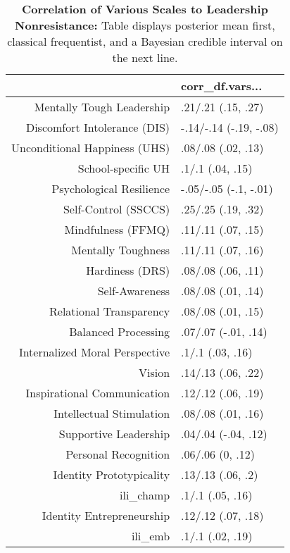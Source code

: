 \begin{table}[ht]
\centering
\begin{tabular}{rl}
  \hline
 & corr\_df.vars... \\ 
  \hline
Mentally Tough Leadership & .21/.21 (.15, .27) \\ 
  Discomfort Intolerance (DIS) & -.14/-.14 (-.19, -.08) \\ 
  Unconditional Happiness (UHS) & .08/.08 (.02, .13) \\ 
  School-specific UH & .1/.1 (.04, .15) \\ 
  Psychological Resilience & -.05/-.05 (-.1, -.01) \\ 
  Self-Control (SSCCS) & .25/.25 (.19, .32) \\ 
  Mindfulness (FFMQ) & .11/.11 (.07, .15) \\ 
  Mentally Toughness & .11/.11 (.07, .16) \\ 
  Hardiness (DRS) & .08/.08 (.06, .11) \\ 
  Self-Awareness & .08/.08 (.01, .14) \\ 
  Relational Transparency & .08/.08 (.01, .15) \\ 
  Balanced Processing & .07/.07 (-.01, .14) \\ 
  Internalized Moral Perspective & .1/.1 (.03, .16) \\ 
  Vision & .14/.13 (.06, .22) \\ 
  Inspirational Communication & .12/.12 (.06, .19) \\ 
  Intellectual Stimulation & .08/.08 (.01, .16) \\ 
  Supportive Leadership & .04/.04 (-.04, .12) \\ 
  Personal Recognition & .06/.06 (0, .12) \\ 
  Identity Prototypicality & .13/.13 (.06, .2) \\ 
  ili\_champ & .1/.1 (.05, .16) \\ 
  Identity Entrepreneurship & .12/.12 (.07, .18) \\ 
  ili\_emb & .1/.1 (.02, .19) \\ 
   \hline
\end{tabular}
\caption{\textbf{Correlation of Various Scales to Leadership Nonresistance:} Table displays posterior mean first, classical frequentist, and a Bayesian credible interval on the next line.} 
\label{tab:lnr_corr}
\end{table}
